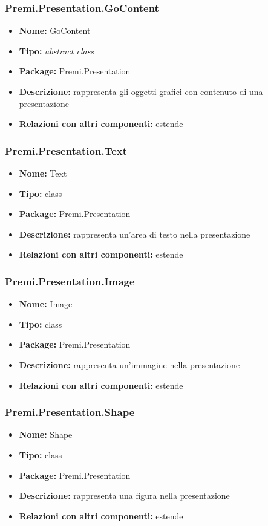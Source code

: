 \subsubsection{Premi.Presentation.GoContent}
\begin{itemize}
  \item \textbf{Nome:} GoContent
  \item \textbf{Tipo:} \textit{abstract class}
  \item \textbf{Package:} Premi.Presentation
  \item \textbf{Descrizione:} rappresenta gli oggetti grafici con contenuto di una presentazione
  \item \textbf{Relazioni con altri componenti:} estende 
\end{itemize}
\subsubsection{Premi.Presentation.Text}
\begin{itemize}
  \item \textbf{Nome:} Text
  \item \textbf{Tipo:} class
  \item \textbf{Package:} Premi.Presentation
  \item \textbf{Descrizione:} rappresenta un'area di testo nella presentazione
    \item \textbf{Relazioni con altri componenti:} estende 
\end{itemize}
\subsubsection{Premi.Presentation.Image}
\begin{itemize}
  \item \textbf{Nome:} Image
  \item \textbf{Tipo:} class
  \item \textbf{Package:} Premi.Presentation
  \item \textbf{Descrizione:} rappresenta un'immagine nella presentazione
      \item \textbf{Relazioni con altri componenti:} estende 
\end{itemize}
\subsubsection{Premi.Presentation.Shape}
\begin{itemize}
  \item \textbf{Nome:} Shape
  \item \textbf{Tipo:} class
  \item \textbf{Package:} Premi.Presentation
  \item \textbf{Descrizione:} rappresenta una figura nella presentazione
      \item \textbf{Relazioni con altri componenti:} estende 
\end{itemize}
